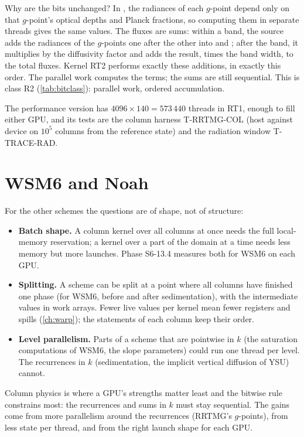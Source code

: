 Why are the bits unchanged? In , the radiances of each $g$-point depend only on that $g$-point's optical
depths and Planck fractions, so computing them in separate threads gives the same values. The fluxes are sums: within
a band, the source adds the radiances of the $g$-points one after the other into  and ; after the
band, it multiplies by the diffusivity factor and adds the result, times the band width, to the total fluxes. Kernel
RT2 performs exactly these additions, in exactly this order. The parallel work computes the terms; the sums are still
sequential. This is class R2 (\cref{tab:bitclass}): parallel work, ordered accumulation.

The performance version has $4096 \times 140 = 573\,440$ threads in RT1, enough to fill either GPU, and its tests are
the column harness T-RRTMG-COL (host against device on $10^5$ columns from the reference state) and the radiation
window T-TRACE-RAD.

\section{WSM6 and Noah}

For the other schemes the questions are of shape, not of structure:
\begin{itemize}
  \item \textbf{Batch shape.} A column kernel over all columns at once needs the full local-memory reservation; a
    kernel over a part of the domain at a time needs less memory but more launches. Phase S6-13.4 measures both for
    WSM6 on each GPU.
  \item \textbf{Splitting.} A scheme can be split at a point where all columns have finished one phase (for WSM6,
    before and after sedimentation), with the intermediate values in work arrays. Fewer live values per kernel mean
    fewer registers and spills (\cref{ch:warp}); the statements of each column keep their order.
  \item \textbf{Level parallelism.} Parts of a scheme that are pointwise in $k$ (the saturation computations of WSM6,
    the slope parameters) could run one thread per level. The recurrences in $k$ (sedimentation, the implicit
    vertical diffusion of YSU) cannot.
\end{itemize}

\begin{keypoint}
Column physics is where a GPU's strengths matter least and the bitwise rule constrains most: the recurrences and sums
in $k$ must stay sequential. The gains come from more parallelism around the recurrences (RRTMG's $g$-points), from
less state per thread, and from the right launch shape for each GPU.
\end{keypoint}
